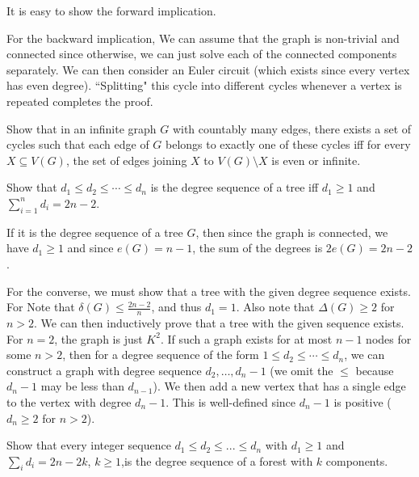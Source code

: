 \begin{solution}
It is easy to show the forward implication.

For the backward implication, We can assume that the graph is non-trivial and connected since otherwise, we can just solve each of the connected components separately. We can then consider an Euler circuit (which exists since every vertex has even degree). ``Splitting" this cycle into different cycles whenever a vertex is repeated completes the proof.
\end{solution}

\begin{exercise}
Show that in an infinite graph $G$ with countably many edges, there exists a set of cycles such that each edge of $G$ belongs to exactly one of these cycles iff for every $X\subseteq V(G)$, the set of edges joining $X$ to $V(G)\setminus X$ is even or infinite.
\end{exercise}
\begin{solution}

\end{solution}

\begin{exercise}
Show that $d_1\leq d_2\leq \cdots \leq d_n$ is the degree sequence of a tree iff $d_1\geq 1$ and $\sum_{i=1}^n d_i = 2n-2$.
\end{exercise}
\begin{solution}
If it is the degree sequence of a tree $G$, then since the graph is connected, we have $d_1\geq 1$ and since $e(G)=n-1$, the sum of the degrees is $2e(G)=2n-2$.

For the converse, we must show that a tree with the given degree sequence exists. For  Note that $\delta(G)\leq \frac{2n-2}{n}$, and thus $d_1=1$. Also note that $\Delta(G)\geq 2$ for $n>2$. We can then inductively prove that a tree with the given sequence exists. For $n=2$, the graph is just $K^2$. If such a graph exists for at most $n-1$ nodes for some $n>2$, then for a degree sequence of the form $1\leq d_2\leq\cdots\leq d_n$, we can construct a graph with degree sequence $d_2,\ldots,d_n-1$ (we omit the $\leq$ because $d_n-1$ may be less than $d_{n-1}$). We then add a new vertex that has a single edge to the vertex with degree $d_n-1$. This is well-defined since $d_n-1$ is positive ($d_n\geq 2$ for $n>2$).
\end{solution}

\begin{exercise}
Show that every integer sequence $d_1 \leq d_2 \leq ... \leq d_n$ with $d_1\geq 1$ and $\sum_i d_i=2n-2k$, $k\ge 1$,is the degree sequence of a forest with $k$ components.
\end{exercise}
\begin{solution}

\end{solution}

